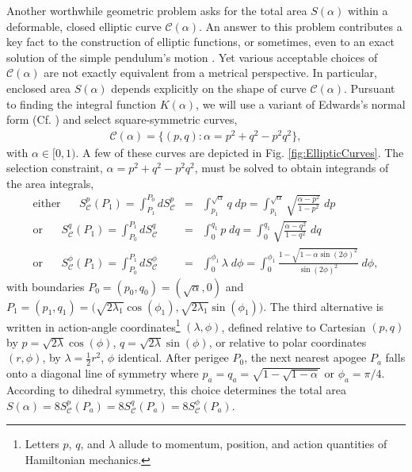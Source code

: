 \documentclass[nofootinbib,preprint]{revtex4-1}
\begin{document}
Another worthwhile geometric problem asks for the total area $S(\alpha)$ within a 
deformable, closed elliptic curve $\mathcal{C}(\alpha)$. An answer to this problem 
contributes a key fact to the construction of elliptic functions, or sometimes, even 
to an exact solution of the simple pendulum's motion \cite{KLEE2020Pendulum}. Yet various acceptable 
choices of $\mathcal{C}(\alpha)$ are not exactly equivalent from a metrical perspective. 
In particular, enclosed area $S(\alpha)$ depends explicitly on the shape of curve 
$\mathcal{C}(\alpha)$. Pursuant to finding the integral function $K(\alpha)$,
we will use a variant of Edwards's normal form (Cf. \cite{EDWARDS2007}) and 
select square-symmetric curves,
\begin{eqnarray}
\mathcal{C}(\alpha) = \Big\{(p,q) : \alpha = p^2 + q^2 - p^2 q^2 \Big\}, \nonumber
\end{eqnarray}
with $\alpha \in [0,1)$. A few of these curves are depicted in Fig. \ref{fig:EllipticCurves}. 
The selection constraint, $\alpha = p^2 +q^2 - p^2q^2$, must be solved to obtain 
integrands of the area integrals, \FloatBarrier \noindent
\begin{eqnarray}
\text{either}\;\;\;\;\;\; S^{p}_{\mathcal{C}}(P_1)
 =  \int_{P_1}^{P_0}dS^{p}_{\mathcal{C}} 
&=& \int^{\sqrt{\alpha}}_{p_1} q \;dp  
= \int^{\sqrt{\alpha}}_{p_1} \sqrt{\frac{\alpha-p^2}{1-p^2}}\;dp  \nonumber \\
\text{or} \;\;\;\;\;\; S^{q}_{\mathcal{C}}(P_1) =  \int_{P_0}^{P_1}dS^{q}_{\mathcal{C}} 
&=& \int_{0}^{q_1} p \;dq  
= \int_{0}^{q_1} \sqrt{\frac{\alpha-q^2}{1-q^2}}\;dq  \nonumber \\
\text{or} \;\;\;\;\;\;  S^{\phi}_{\mathcal{C}}(P_1) 
= \int_{P_0}^{P_1} dS^{\phi}_{\mathcal{C}}
&=& \int_{0}^{\phi_1} \lambda \;d\phi
= \int_{0}^{\phi_1} \frac{1-\sqrt{1-\alpha \sin(2\phi)^2}}{\sin(2\phi)^2} \; d\phi,   \nonumber 
\end{eqnarray}
with boundaries $P_0=(p_0,q_0)=(\sqrt{\alpha},0)$ and 
$P_1=(p_1,q_1)=\Big(\sqrt{2\lambda_1}\cos(\phi_1),\sqrt{2\lambda_1}\sin(\phi_1)\Big)$. 
The third alternative is written in action-angle coordinates\footnote{Letters 
$p$, $q$, and $\lambda$ allude to momentum, position, and 
action quantities of Hamiltonian mechanics.} 
$(\lambda,\phi)$, defined relative to Cartesian $(p,q)$ by $p=\sqrt{2\lambda}\cos(\phi)$, 
$q=\sqrt{2\lambda}\sin(\phi)$, or relative to polar coordinates $(r,\phi)$, 
by $\lambda = \tfrac{1}{2} r^2$, $\phi$ identical. After perigee $P_0$, the 
next nearest apogee $P_{a}$ falls onto a diagonal line of symmetry where 
$p_a=q_a=\sqrt{1-\sqrt{1-\alpha}}$ or $\phi_a = \pi/4$. According to dihedral 
symmetry, this choice determines the total area 
$S(\alpha)=8S^{p}_\mathcal{C}(P_a)=8S^{q}_\mathcal{C}(P_a)=8S^{\phi}_\mathcal{C}(P_a)$.
\end{document}

